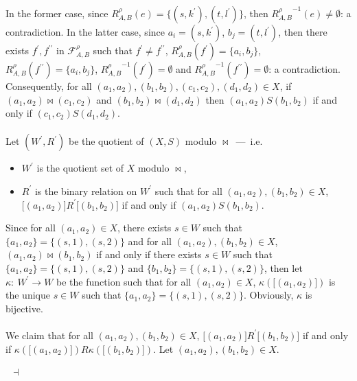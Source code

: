 \documentclass[draft]{article}
\newenvironment{proof}{{\bf Proof:}}{~$\dashv$\\}
\begin{document}
\begin{proof}
In the former case, since $R_{A,B}^{\rho}(e){=}\{(s,k^{\prime}),
%
%
%
%
%
%
%
%
%
%
%
%
$\linebreak$
%
%
%
%
%
%
%
%
%
%
%
%
(t,l^{\prime})\}$, then ${R_{A,B}^{\rho}}^{{-}1}(e){\not=}\emptyset$: a contradiction.
In the latter case, since $a_{i}{=}(s,k^{\prime})$, $b_{j}{=}(t,l^{\prime})$, then there exists $f^{\prime},f^{\prime\prime}$ in ${\mathcal F}_{A,B}^{\rho}$ such that $f^{\prime}{\not=}f^{\prime\prime}$, $R_{A,B}^{\rho}(f^{\prime}){=}\{a_{i},b_{j}\}$, $R_{A,B}^{\rho}(f^{\prime\prime}){=}\{a_{i},b_{j}\}$, ${R_{A,B}^{\rho}}^{{-}1}(f^{\prime}){=}\emptyset$ and ${R_{A,B}^{\rho}}^{{-}1}(f^{\prime\prime}){=}\emptyset$: a contradiction.
Consequently, for all $(a_{1},a_{2}),(b_{1},b_{2}),(c_{1},c_{2}),(d_{1},d_{2}){\in}X$, if $(a_{1},a_{2}){\bowtie}(c_{1},c_{2})$ and $(b_{1},b_{2}){\bowtie}(d_{1},d_{2})$ then $(a_{1},a_{2}){S}(b_{1},b_{2})$ if and only if $(c_{1},c_{2}){S}(d_{1},d_{2})$.
%
%
\\
\\
%
%
Let $(W^{\prime},R^{\prime})$ be the quotient of $(X,S)$ modulo $\bowtie$~---~i.e.
%
%
\begin{itemize}
%
%
\item $W^{\prime}$ is the quotient set of $X$ modulo $\bowtie$,
%
%
\item $R^{\prime}$ is the binary relation on $W^{\prime}$ such that for all $(a_{1},a_{2}),(b_{1},b_{2}){\in}X$, $\lbrack(a_{1},a_{2})\rbrack{R^{\prime}}\lbrack(b_{1},b_{2})\rbrack$ if and only if $(a_{1},a_{2}){S}(b_{1},b_{2})$.
%
%
\end{itemize}
%
%
Since for all $(a_{1},a_{2}){\in}X$, there exists $s{\in}W$ such that $\{a_{1},a_{2}\}{=}\{(s,1),(s,2)\}$ and for all $(a_{1},a_{2}),(b_{1},b_{2}){\in}X$, $(a_{1},a_{2}){\bowtie}(b_{1},b_{2})$ if and only if there exists $s{\in}W$ such that $\{a_{1},a_{2}\}{=}\{(s,1),(s,2)\}$ and $\{b_{1},b_{2}\}{=}\{(s,1),(s,2)\}$, then let $\kappa:\ W^{\prime}{\longrightarrow}W$ be the function such that for all $(a_{1},a_{2}){\in}X$, $\kappa(\lbrack(a_{1},a_{2})\rbrack)$ is the unique $s{\in}W$ such that $\{a_{1},a_{2}\}{=}\{(s,1),(s,2)\}$.
Obviously, $\kappa$ is bijective.
%
\\
\\
%
%
We claim that for all $(a_{1},a_{2}),(b_{1},b_{2}){\in}X$, $\lbrack(a_{1},a_{2})\rbrack{R^{\prime}}\lbrack(b_{1},b_{2})\rbrack$ if and only if $\kappa(\lbrack(a_{1},a_{2})\rbrack){R}\kappa(\lbrack(b_{1},b_{2})\rbrack)$.
Let $(a_{1},a_{2}),(b_{1},b_{2}){\in}X$.

\end{proof}
\end{document}
